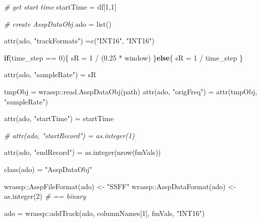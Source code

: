 \documentclass[
]{book}
\newenvironment{Shaded}{\begin{snugshade}}{\end{snugshade}}
\newcommand{\CommentTok}[1]{\textcolor[rgb]{0.56,0.35,0.01}{\textit{#1}}}
\newcommand{\ControlFlowTok}[1]{\textcolor[rgb]{0.13,0.29,0.53}{\textbf{#1}}}
\newcommand{\DecValTok}[1]{\textcolor[rgb]{0.00,0.00,0.81}{#1}}
\newcommand{\FloatTok}[1]{\textcolor[rgb]{0.00,0.00,0.81}{#1}}
\newcommand{\FunctionTok}[1]{\textcolor[rgb]{0.00,0.00,0.00}{#1}}
\newcommand{\NormalTok}[1]{#1}
\newcommand{\OtherTok}[1]{\textcolor[rgb]{0.56,0.35,0.01}{#1}}
\newcommand{\SpecialCharTok}[1]{\textcolor[rgb]{0.00,0.00,0.00}{#1}}
\newcommand{\StringTok}[1]{\textcolor[rgb]{0.31,0.60,0.02}{#1}}
\begin{document}
\begin{Shaded}
\begin{Highlighting}[]
  \CommentTok{\# get start time}
\NormalTok{  startTime }\OtherTok{=}\NormalTok{ df[}\DecValTok{1}\NormalTok{,}\DecValTok{1}\NormalTok{]}

  \CommentTok{\# create AsspDataObj}
\NormalTok{  ado }\OtherTok{=} \FunctionTok{list}\NormalTok{()}

  \FunctionTok{attr}\NormalTok{(ado, }\StringTok{"trackFormats"}\NormalTok{) }\OtherTok{=}\FunctionTok{c}\NormalTok{(}\StringTok{"INT16"}\NormalTok{, }\StringTok{"INT16"}\NormalTok{)}

  \ControlFlowTok{if}\NormalTok{(time\_step }\SpecialCharTok{==} \DecValTok{0}\NormalTok{)\{}
\NormalTok{    sR }\OtherTok{=} \DecValTok{1} \SpecialCharTok{/}\NormalTok{ (}\FloatTok{0.25} \SpecialCharTok{*}\NormalTok{ window)}
\NormalTok{  \}}\ControlFlowTok{else}\NormalTok{\{}
\NormalTok{    sR }\OtherTok{=} \DecValTok{1} \SpecialCharTok{/}\NormalTok{ time\_step}
\NormalTok{  \}}

  \FunctionTok{attr}\NormalTok{(ado, }\StringTok{"sampleRate"}\NormalTok{) }\OtherTok{=}\NormalTok{ sR}

\NormalTok{  tmpObj }\OtherTok{=}\NormalTok{ wrassp}\SpecialCharTok{::}\FunctionTok{read.AsspDataObj}\NormalTok{(path)}
  \FunctionTok{attr}\NormalTok{(ado, }\StringTok{"origFreq"}\NormalTok{) }\OtherTok{=} \FunctionTok{attr}\NormalTok{(tmpObj, }\StringTok{"sampleRate"}\NormalTok{)}

  \FunctionTok{attr}\NormalTok{(ado, }\StringTok{"startTime"}\NormalTok{) }\OtherTok{=}\NormalTok{ startTime}

  \CommentTok{\# attr(ado, "startRecord") = as.integer(1)}

  \FunctionTok{attr}\NormalTok{(ado, }\StringTok{"endRecord"}\NormalTok{) }\OtherTok{=} \FunctionTok{as.integer}\NormalTok{(}\FunctionTok{nrow}\NormalTok{(fmVals))}

  \FunctionTok{class}\NormalTok{(ado) }\OtherTok{=} \StringTok{"AsspDataObj"}

\NormalTok{  wrassp}\SpecialCharTok{::}\FunctionTok{AsspFileFormat}\NormalTok{(ado) }\OtherTok{\textless{}{-}} \StringTok{"SSFF"}
\NormalTok{  wrassp}\SpecialCharTok{::}\FunctionTok{AsspDataFormat}\NormalTok{(ado) }\OtherTok{\textless{}{-}} \FunctionTok{as.integer}\NormalTok{(}\DecValTok{2}\NormalTok{) }\CommentTok{\# == binary}

\NormalTok{  ado }\OtherTok{=}\NormalTok{ wrassp}\SpecialCharTok{::}\FunctionTok{addTrack}\NormalTok{(ado, columnNames[}\DecValTok{1}\NormalTok{], fmVals, }\StringTok{"INT16"}\NormalTok{)}


\end{Highlighting}
\end{Shaded}
\end{document}
